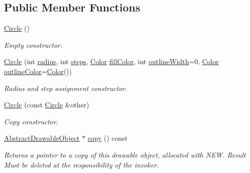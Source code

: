 \subsection*{Public Member Functions}
\begin{DoxyCompactItemize}
\item 
\mbox{\label{classcturtle_1_1Circle_adcb8d37883313b9694ac0add0cf4a2cb}} 
\hyperlink{classcturtle_1_1Circle_adcb8d37883313b9694ac0add0cf4a2cb}{Circle} ()
\begin{DoxyCompactList}\small\item\em Empty constructor. \end{DoxyCompactList}\item 
\hyperlink{classcturtle_1_1Circle_ae9fff4148fa917a5bac60301985ea085}{Circle} (int \hyperlink{classcturtle_1_1Circle_a01dfc45c6a56b58e040e4de2cc8abda5}{radius}, int \hyperlink{classcturtle_1_1Circle_a5bf905891d9a0d21b08070698c71321e}{steps}, \hyperlink{classcturtle_1_1Color}{Color} \hyperlink{classcturtle_1_1AbstractDrawableObject_a37d635a02ad3e5206a6eb99b7b5f1963}{fill\+Color}, int \hyperlink{classcturtle_1_1AbstractDrawableObject_aeffaecc245057e9a42e5688671a77f52}{outline\+Width}=0, \hyperlink{classcturtle_1_1Color}{Color} \hyperlink{classcturtle_1_1AbstractDrawableObject_abd04640855e7623bb84b52babd8b32b6}{outline\+Color}=\hyperlink{classcturtle_1_1Color}{Color}())
\begin{DoxyCompactList}\small\item\em Radius and step assignment constructor. \end{DoxyCompactList}\item 
\hyperlink{classcturtle_1_1Circle_a2a74f8664da6643f8327c2fa49659cdd}{Circle} (const \hyperlink{classcturtle_1_1Circle}{Circle} \&other)
\begin{DoxyCompactList}\small\item\em Copy constructor. \end{DoxyCompactList}\item 
\mbox{\label{classcturtle_1_1Circle_aa326797d515e89c8b75099018e6d0118}} 
\hyperlink{classcturtle_1_1AbstractDrawableObject}{Abstract\+Drawable\+Object} $\ast$ \hyperlink{classcturtle_1_1Circle_aa326797d515e89c8b75099018e6d0118}{copy} () const
\begin{DoxyCompactList}\small\item\em Returns a pointer to a copy of this drawable object, allocated with N\+EW. Result Must be deleted at the responsibility of the invoker. \end{DoxyCompactList}\item 

\end{DoxyCompactItemize}
